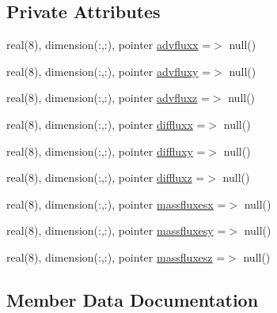 \subsection*{Private Attributes}
\begin{DoxyCompactItemize}
\item 
real(8), dimension(\+:,\+:), pointer \mbox{\hyperlink{structmodulerunoffproperties_1_1t__fluxes_ab6f26a3609bd4e46d1e1596b3b3f7551}{advfluxx}} =$>$ null()
\item 
real(8), dimension(\+:,\+:), pointer \mbox{\hyperlink{structmodulerunoffproperties_1_1t__fluxes_a7106a7af974d866ae4a64d410f5f3483}{advfluxy}} =$>$ null()
\item 
real(8), dimension(\+:,\+:), pointer \mbox{\hyperlink{structmodulerunoffproperties_1_1t__fluxes_a2273f58099eb03572b620d80ad46acdc}{advfluxz}} =$>$ null()
\item 
real(8), dimension(\+:,\+:), pointer \mbox{\hyperlink{structmodulerunoffproperties_1_1t__fluxes_ac5c5460eddafbb6ae69ed8d190bcc217}{diffluxx}} =$>$ null()
\item 
real(8), dimension(\+:,\+:), pointer \mbox{\hyperlink{structmodulerunoffproperties_1_1t__fluxes_abe73f9729931b9c0e3a9f21366240daf}{diffluxy}} =$>$ null()
\item 
real(8), dimension(\+:,\+:), pointer \mbox{\hyperlink{structmodulerunoffproperties_1_1t__fluxes_a7c61511e32418139499e9c5f91bba6ec}{diffluxz}} =$>$ null()
\item 
real(8), dimension(\+:,\+:), pointer \mbox{\hyperlink{structmodulerunoffproperties_1_1t__fluxes_afa49e651bee7891da614db6114a3ecc9}{massfluxesx}} =$>$ null()
\item 
real(8), dimension(\+:,\+:), pointer \mbox{\hyperlink{structmodulerunoffproperties_1_1t__fluxes_a5d621144c34d8048ab534905dd0ff3d6}{massfluxesy}} =$>$ null()
\item 
real(8), dimension(\+:,\+:), pointer \mbox{\hyperlink{structmodulerunoffproperties_1_1t__fluxes_a7e7f68c927e11137e10f8eb1092d810c}{massfluxesz}} =$>$ null()
\end{DoxyCompactItemize}


\subsection{Member Data Documentation}
\mbox{\label{structmodulerunoffproperties_1_1t__fluxes_ab6f26a3609bd4e46d1e1596b3b3f7551}} 
